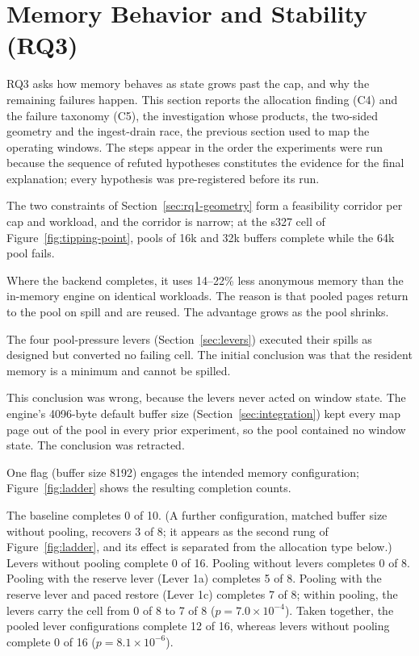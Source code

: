 \section{Memory Behavior and Stability (RQ3)\label{sec:rq3}}

RQ3 asks how memory behaves as state grows past the cap, and why the remaining failures happen.
This section reports the allocation finding (C4) and the failure taxonomy (C5), the investigation whose products, the two-sided geometry and the ingest-drain race, the previous section used to map the operating windows.
The steps appear in the order the experiments were run because the sequence of refuted hypotheses constitutes the evidence for the final explanation; every hypothesis was pre-registered before its run.

The two constraints of Section~\ref{sec:rq1-geometry} form a feasibility corridor per cap and workload, and the corridor is narrow; at the s327 cell of Figure~\ref{fig:tipping-point}, pools of 16k and 32k buffers complete while the 64k pool fails.

Where the backend completes, it uses 14--22\% less anonymous memory than the in-memory engine on identical workloads.
The reason is that pooled pages return to the pool on spill and are reused.
The advantage grows as the pool shrinks.

The four pool-pressure levers (Section~\ref{sec:levers}) executed their spills as designed but converted no failing cell.
The initial conclusion was that the resident memory is a minimum and cannot be spilled.

This conclusion was wrong, because the levers never acted on window state.
The engine's 4096-byte default buffer size (Section~\ref{sec:integration}) kept every map page out of the pool in every prior experiment, so the pool contained no window state.
The conclusion was retracted.

One flag (buffer size 8192) engages the intended memory configuration; Figure~\ref{fig:ladder} shows the resulting completion counts.

The baseline completes 0 of 10.
(A further configuration, matched buffer size without pooling, recovers 3 of 8; it appears as the second rung of Figure~\ref{fig:ladder}, and its effect is separated from the allocation type below.)
Levers without pooling complete 0 of 16.
Pooling without levers completes 0 of 8.
Pooling with the reserve lever (Lever 1a) completes 5 of 8.
Pooling with the reserve lever and paced restore (Lever 1c) completes 7 of 8; within pooling, the levers carry the cell from 0 of 8 to 7 of 8 ($p = 7.0 \times 10^{-4}$).
Taken together, the pooled lever configurations complete 12 of 16, whereas levers without pooling complete 0 of 16 ($p = 8.1 \times 10^{-6}$).

